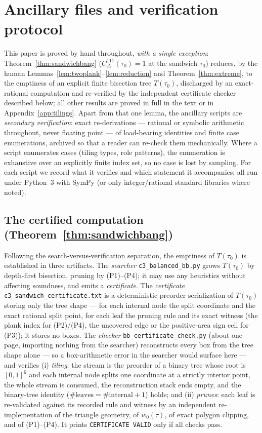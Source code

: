 \documentclass[11pt,reqno]{amsart}
\theoremstyle{plain}
\theoremstyle{definition}
\theoremstyle{remark}
\begin{document}
\section{Ancillary files and verification protocol}\label{app:ancillary}

This paper is proved by hand throughout, \emph{with a single exception}:
Theorem~\ref{thm:sandwichbang} ($C^{111}_\Delta(\tau_0)=1$ at the sandwich
$\tau_0$) reduces, by the human Lemmas~\ref{lem:twoplank}--\ref{lem:reduction}
and Theorem~\ref{thm:extreme}, to the emptiness of an explicit finite
bisection tree $T(\tau_0)$, discharged by an exact-rational computation and
re-verified by the independent certificate checker described below; all other
results are proved in full in the text or in Appendix~\ref{app:tilings}. Apart
from that one lemma, the ancillary scripts are \emph{secondary verification}:
exact re-derivations --- rational or symbolic arithmetic throughout, never
floating point --- of load-bearing identities and finite case enumerations,
archived so that a reader can re-check them mechanically. Where a script
enumerates cases (tiling types, role patterns), the enumeration is exhaustive
over an explicitly finite index set, so no case is lost by sampling. For each
script we record what it verifies and which statement it accompanies; all run
under Python~3 with SymPy (or only integer/rational standard libraries where
noted).

\subsection*{The certified computation (Theorem~\ref{thm:sandwichbang})}
Following the search-versus-verification separation, the emptiness of
$T(\tau_0)$ is established in three artifacts. The \emph{searcher}
\texttt{c3\_balanced\_bb.py} grows $T(\tau_0)$ by depth-first bisection,
pruning by (P1)--(P4); it may use any heuristics without affecting soundness,
and emits a \emph{certificate}. The \emph{certificate}
\texttt{c3\_sandwich\_certificate.txt} is a deterministic preorder
serialization of $T(\tau_0)$ storing only the tree shape --- for each internal
node the split coordinate and the exact rational split point, for each leaf the
pruning rule and its exact witness (the plank index for (P2)/(P4), the
uncovered edge or the positive-area sign cell for (P3)); it stores no boxes.
The \emph{checker} \texttt{bb\_certificate\_check.py} (about one page, importing
nothing from the searcher) reconstructs every box from the tree shape alone ---
so a box-arithmetic error in the searcher would surface here --- and verifies
(i) \emph{tiling}: the stream is the preorder of a binary tree whose root is
$[0,1]^6$ and each internal node splits one coordinate at a strictly interior
point, the whole stream is consumed, the reconstruction stack ends empty, and
the binary-tree identity ($\#\text{leaves}=\#\text{internal}+1$) holds; and
(ii) \emph{prunes}: each leaf is re-validated against its recorded rule and
witness by an independent re-implementation of the triangle geometry, of
$w_0(\tau)$, of exact polygon clipping, and of (P1)--(P4). It prints
\texttt{CERTIFICATE VALID} only if all checks pass.
\end{document}
